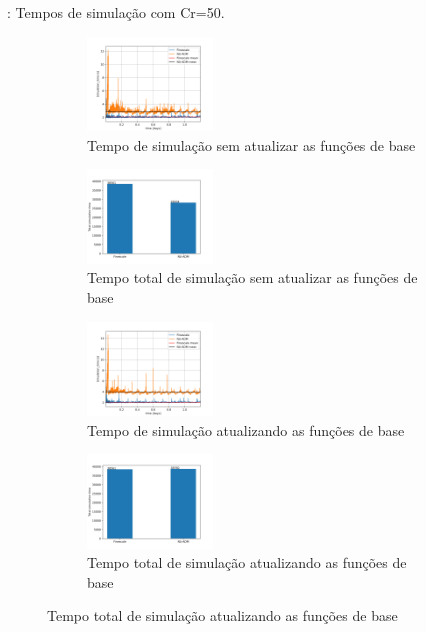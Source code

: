 \documentclass[professionalfont]{beamer}
\begin{document}
\begin{frame}{\FrameProblemName: {\small Tempos de simulação com Cr=50.}}
    \begin{figure}[!h]
        \centering
        \begin{subfigure}{.48\textwidth}
            \centering
            \includegraphics[height=2.5cm]{./imgs/pr2/3k_5000x1x1/cr 50/v2/no_update/svgtopng/figura_case-finescale_3k_5000_CR50_no_updateTempo de simulaçãoActive_volumes.png}
            \caption{Tempo de simulação sem atualizar as funções de base}
        \end{subfigure}
        \hfill
        \begin{subfigure}{.48\textwidth}
            \centering
            \includegraphics[height=2.5cm]{./imgs/pr2/3k_5000x1x1/cr 50/v2/no_update/svgtopng/figura_case-finescale_3k_5000_CR50_no_updateTotal_simulation_time.png}
            \caption{Tempo total de simulação sem atualizar as funções de base}
        \end{subfigure}
        \bigskip
        \begin{subfigure}[t]{.48\textwidth}
            \centering
            \includegraphics[height=2.5cm]{./imgs/pr2/3k_5000x1x1/cr 50/v2/update/svgtopng/figura_case-finescale_3k_5000_CR50_updateTempo de simulaçãoActive_volumes.png}
            \caption{Tempo de simulação atualizando as funções de base}
        \end{subfigure}
        \hfill
        \begin{subfigure}[t]{.48\textwidth}
            \centering
            \includegraphics[height=2.5cm]{./imgs/pr2/3k_5000x1x1/cr 50/v2/update/svgtopng/figura_case-finescale_3k_5000_CR50_updateTotal_simulation_time.png}
            \caption{Tempo total de simulação atualizando as funções de base}
        \end{subfigure}
    
        \label{fig:fig6_pr2-cr50}
    \end{figure}
\end{frame}
\end{document}
